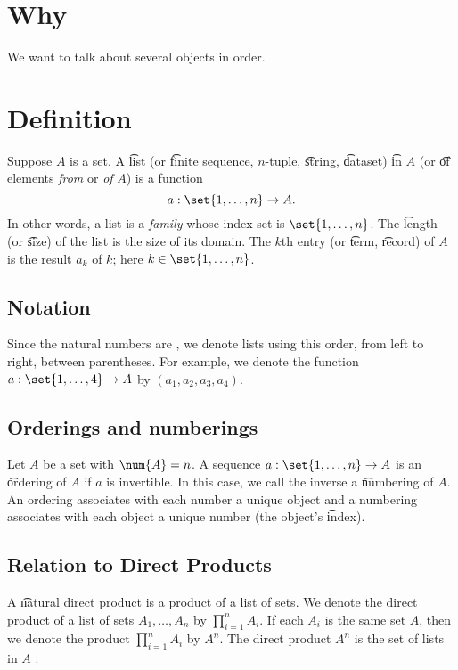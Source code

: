 
\section*{Why}

We want to talk about several objects in order.

\section*{Definition}

Suppose $A$ is a set.
A \t{list} (or \t{finite sequence}, \t{$n$-tuple}, \t{string}, \t{dataset}) \t{in} $A$ (or \t{of} elements \textit{from} or \textit{of} $A$) is a function
\[
a: \set{1, \dots , n} \to A.
\]
In other words, a list is a \textit{family} whose index set is $\set{1, \dots , n}$.
The \t{length} (or \t{size}) of the list is the size of its domain.
The \t{$k$th entry} (or \t{term}, \t{record}) of $A$ is the result $a_k$ of $k$; here $k \in \set{1, \dots , n}$.

\subsection*{Notation}

Since the natural numbers are , we denote lists using this order, from left to right, between parentheses.
For example, we denote the function $a: \set{1, \dots , 4} \to A$ by $(a_1, a_2, a_3, a_4)$.

\subsection*{Orderings and numberings}

Let $A$ be a set with $\num{A} = n$.
A sequence $a: \set{1, \dots , n} \to A$ is an \t{ordering} of $A$ if $a$ is invertible.
In this case, we call the inverse a \t{numbering} of $A$.
An ordering associates with each number a unique object and a numbering associates with each object a unique number (the object's \t{index}).

\subsection*{Relation to Direct Products}

A \t{natural direct product} is a product of a list of sets.
We denote the direct product of a list of sets $A_1, \dots , A_n$ by $\prod_{i = 1}^{n} A_i$.
If each $A_i$ is the same set $A$, then we denote the product $\prod_{i = 1}^{n} A_i$ by $A^n$.
The direct product $A^n$ is the set of lists in $A$ .

